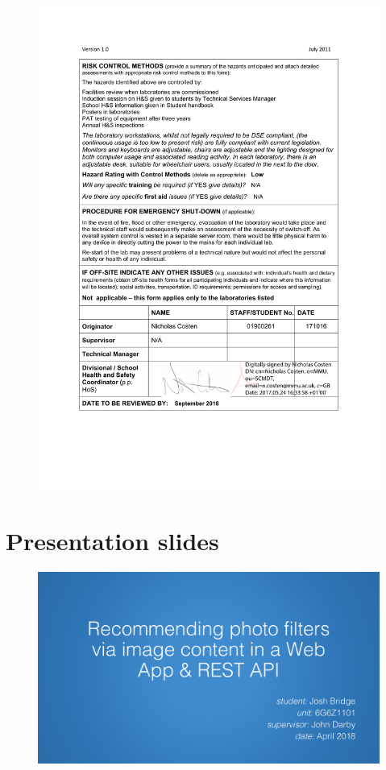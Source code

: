 \documentclass[a4paper,12pt]{report}
\begin{document}
\begin{appendices}
    \begin{figure}[h]
      \centering
      \includegraphics[scale=0.8]{risk-assessment-2}
    \end{figure}

  \chapter{Presentation slides}

    \begin{figure}[h]
      \centering
      \includegraphics[width=0.9\linewidth]{presentation-1}
    \end{figure}


\end{appendices}
\end{document}
